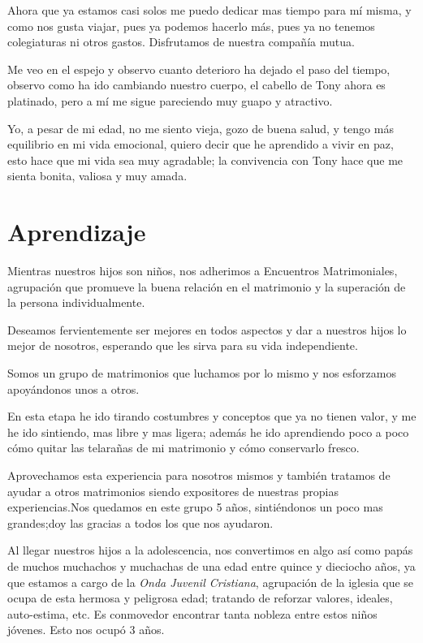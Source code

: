 \documentclass[letterpaper, 12pt]{book}
\begin{document}
Ahora que ya estamos casi solos me puedo dedicar mas tiempo para mí misma, y como nos gusta viajar, pues ya podemos hacerlo más, pues ya no tenemos colegiaturas ni otros gastos. Disfrutamos de nuestra compañía mutua.

Me veo en el espejo y observo cuanto deterioro ha dejado el paso del tiempo, observo como ha ido cambiando nuestro cuerpo, el cabello de Tony ahora es platinado, pero a mí me sigue pareciendo muy guapo y atractivo.

Yo, a pesar de mi edad, no me siento vieja, gozo de buena salud, y tengo más equilibrio en mi vida emocional, quiero decir que he aprendido a vivir en paz, esto hace que mi vida sea muy agradable; la convivencia con Tony hace que me sienta bonita, valiosa y muy amada.

\chapter{Aprendizaje}
Mientras nuestros hijos son niños, nos adherimos a Encuentros Matrimoniales, agrupación que promueve la buena relación en el matrimonio y la superación de la persona individualmente.

Deseamos fervientemente ser mejores en todos aspectos y dar a nuestros hijos lo mejor de nosotros, esperando que les sirva para su vida independiente.

Somos un grupo de matrimonios que luchamos por lo mismo y nos esforzamos apoyándonos unos a otros.

En esta etapa he ido tirando costumbres y conceptos que ya no tienen valor, y me he ido sintiendo, mas libre y mas ligera;
además he ido aprendiendo poco a poco cómo quitar las telarañas de mi matrimonio y cómo conservarlo fresco.

Aprovechamos esta experiencia para nosotros mismos y también tratamos de ayudar a otros matrimonios siendo expositores de nuestras propias experiencias.Nos quedamos en este grupo 5 años, sintiéndonos un poco mas grandes;doy las gracias a todos los que nos ayudaron.

Al llegar nuestros hijos a la adolescencia, nos convertimos en algo así como papás de muchos muchachos y muchachas de una edad entre quince y dieciocho años, ya que estamos a cargo de la \textit{Onda Juvenil Cristiana}, agrupación de la iglesia que se ocupa de esta hermosa y peligrosa edad; tratando de reforzar valores, ideales, auto-estima, etc. Es conmovedor encontrar tanta nobleza entre estos niños jóvenes. Esto nos ocupó 3 años.
\end{document}
